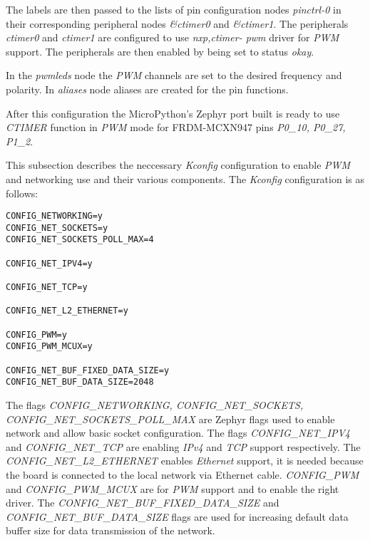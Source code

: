 \documentclass[twoside, 12pt]{article}
\begin{document}
The labels are then passed to the lists of pin configuration nodes \textit{pinctrl-0} in 
their corresponding peripheral nodes \textit{\&ctimer0} and \textit{\&ctimer1}. The 
peripherals \textit{ctimer0} and \textit{ctimer1} are configured to use \textit{nxp,ctimer-
pwm} driver for \textit{PWM} support. The peripherals are then enabled by being set to status \textit{okay}.

In the \textit{pwmleds} node the \textit{PWM} channels are set to the desired frequency and polarity. In \textit{aliases} node aliases are created for the pin functions.

After this configuration the MicroPython's Zephyr port built is ready to use \textit{CTIMER} function in \textit{PWM} mode for FRDM-MCXN947 pins \textit{P0\_10, P0\_27, P1\_2}.

This subsection describes the neccessary \textit{Kconfig} configuration to enable \textit{PWM} and networking use and their various components. The \textit{Kconfig} configuration is as follows:

\begin{lstlisting}[caption={Configuring PWM and networking support in MicroPython's Zephyr port with Kconfig},breaklines=true]
CONFIG_NETWORKING=y
CONFIG_NET_SOCKETS=y
CONFIG_NET_SOCKETS_POLL_MAX=4

CONFIG_NET_IPV4=y

CONFIG_NET_TCP=y

CONFIG_NET_L2_ETHERNET=y

CONFIG_PWM=y
CONFIG_PWM_MCUX=y

CONFIG_NET_BUF_FIXED_DATA_SIZE=y
CONFIG_NET_BUF_DATA_SIZE=2048 
\end{lstlisting}

The flags \textit{CONFIG\_NETWORKING, CONFIG\_NET\_SOCKETS, CONFIG\_NET\_SOCKETS\_POLL\_MAX} 
are Zephyr flags used to enable network and allow basic socket configuration. The flags 
\textit{CONFIG\_NET\_IPV4} and \textit{CONFIG\_NET\_TCP} are enabling \textit{IPv4} and 
\textit{TCP} support respectively. The \textit{CONFIG\_NET\_L2\_ETHERNET} enables 
\textit{Ethernet} support, it is needed because the board is connected to the local network
via Ethernet cable. \textit{CONFIG\_PWM} and \textit{CONFIG\_PWM\_MCUX} are for \textit{PWM}
support and to enable the right driver. The \textit{CONFIG\_NET\_BUF\_FIXED\_DATA\_SIZE} and 
\textit{CONFIG\_NET\_BUF\_DATA\_SIZE} flags are used for increasing default data buffer size 
for data transmission of the network. 
\end{document}
